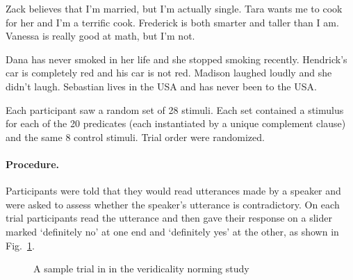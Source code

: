 \documentclass[11pt,fleqn]{article}
\newcommand{\6}{\mbox{$[\hspace*{-.6mm}[$}}
\newcommand{\9}{\mbox{$]\hspace*{-.6mm}]$}}
\newcommand{\figref}[1]{Fig.~\ref{#1}}
\begin{document}
\begin{exe}
\ex\label{control-good}
\begin{xlist}
\ex Zack believes that I'm married, but I'm actually single.
\ex Tara wants me to cook for her and I'm a terrific cook.
\ex Frederick is both smarter and taller than I am.
\ex Vanessa is really good at math, but I'm not.
\end{xlist}
\ex\label{control-bad}
\begin{xlist}
\ex Dana has never smoked in her life and she stopped smoking recently.
\ex Hendrick's car is completely red and his car is not red.
\ex Madison laughed loudly and she didn't laugh.
\ex Sebastian lives in the USA and has never been to the USA.
\end{xlist}
\end{exe}

Each participant saw a random set of 28 stimuli. Each set contained a stimulus for each of the 20 predicates (each instantiated by a unique complement clause) and the same 8 control stimuli. Trial order were randomized.

\paragraph{Procedure.} Participants were told that they would read utterances made by a speaker and were asked to assess whether the speaker's utterance is contradictory. On each trial participants read the utterance and then gave their response on a slider marked `definitely no' at one end and `definitely yes' at the other, as shown in \figref{f-trial-exp2}.  

\begin{figure}[h!]
\begin{center}
\end{center}
\caption{A sample trial in in the veridicality norming study}\label{f-trial-exp2}
\end{figure}
\end{document}
